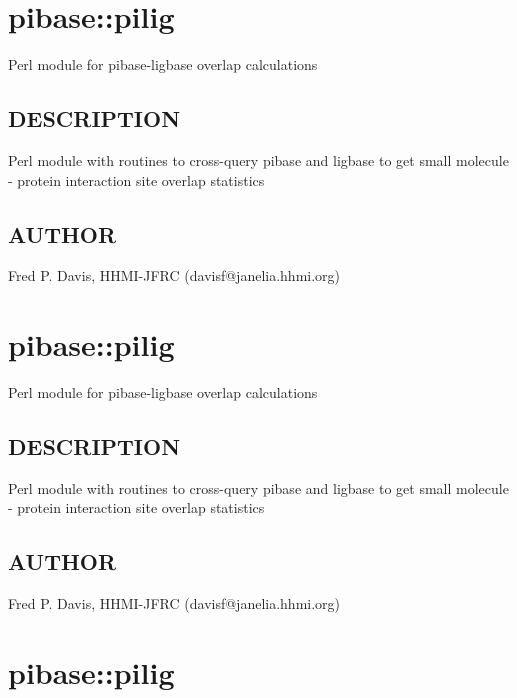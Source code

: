 \documentclass{article}
\begin{document}
\section{pibase::pilig\label{pibase::pilig}}


Perl module for pibase-ligbase overlap calculations

\subsection*{DESCRIPTION\label{pibase::pilig_DESCRIPTION}}


Perl module with routines to cross-query pibase and ligbase
to get small molecule - protein interaction site overlap
statistics

\subsection*{AUTHOR\label{pibase::pilig_AUTHOR}}


Fred P. Davis, HHMI-JFRC (davisf@janelia.hhmi.org)

\clearpage
\section{pibase::pilig\label{pibase::pilig}}


Perl module for pibase-ligbase overlap calculations

\subsection*{DESCRIPTION\label{pibase::pilig_DESCRIPTION}}


Perl module with routines to cross-query pibase and ligbase
to get small molecule - protein interaction site overlap
statistics

\subsection*{AUTHOR\label{pibase::pilig_AUTHOR}}


Fred P. Davis, HHMI-JFRC (davisf@janelia.hhmi.org)

\clearpage
\section{pibase::pilig\label{pibase::pilig}}
\end{document}
